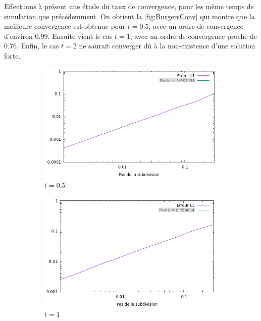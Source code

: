 \documentclass[
	french,
	11pt, %
]{fphw}
\begin{document}
\noindent Effectuons à présent une étude du taux de convergence, pour les même temps de simulation que précédemment. On obtient la \cref{fig:BurgersConv} qui montre que la meilleure convergence est obtenue pour $t=0.5$, avec un ordre de convergence d'environ $0.99$. Ensuite vient le cas $t=1$, avec un ordre de convergence proche de $0.76$. Enfin, le cas $t=2$ ne saurait converger dû à la non-existence d'une solution forte.

\begin{figure}[H]
	\centering
	\begin{subfigure}{0.32\textwidth}
		\centering
		\includegraphics[width=\textwidth]{BurgersConv1.png}
		\caption{$t=0.5$}
	\end{subfigure}
	\begin{subfigure}{0.32\textwidth}
		\centering
		\includegraphics[width=\textwidth]{BurgersConv2.png}
		\caption{$t=1$}
	\end{subfigure}
	\begin{subfigure}{0.32\textwidth}

\end{subfigure}
\end{figure}
\end{document}
